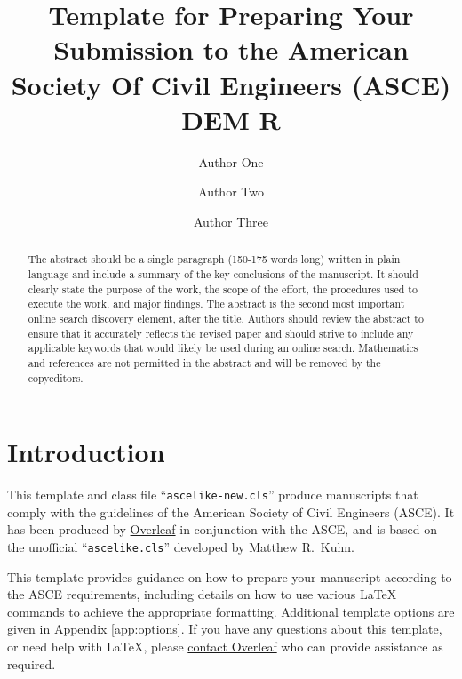 \documentclass[NewProceedings,letterpaper]{ascelike-new}
\begin{document}
\title{Template for Preparing Your Submission to the American Society Of Civil Engineers (ASCE) DEM R}

\author[1]{Author One}
\author[2]{Author Two}
\author[3]{Author Three}


\maketitle

\begin{abstract}
	The abstract should be a single paragraph (150-175 words long) written in plain language and include a summary of the key conclusions of the manuscript. It should clearly state the purpose of the work, the scope of the effort, the procedures used to execute the work, and major findings. The abstract is the second most important online search discovery element, after the title. Authors should review the abstract to ensure that it accurately reflects the revised paper and should strive to include any applicable keywords that would likely be used during an online search. Mathematics and references are not permitted in the abstract and will be removed by the copyeditors.
\end{abstract}

\section{Introduction}
This template and class file ``\texttt{ascelike-new.cls}'' produce manuscripts that comply with the guidelines of the American Society of Civil Engineers (ASCE). It has been produced by \href{https://www.overleaf.com}{Overleaf} in conjunction with the ASCE, and is based on the unofficial ``\texttt{ascelike.cls}'' developed by Matthew R.~Kuhn.

This template provides guidance on how to prepare your manuscript according to the ASCE requirements, including details on how to use various LaTeX commands to achieve the appropriate formatting. Additional template options are given in Appendix \ref{app:options}. If you have any questions about this template, or need help with LaTeX, please \href{https://www.overleaf.com/contact}{contact Overleaf} who can provide assistance as required.
\end{document}

